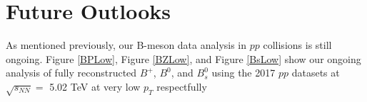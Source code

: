 









\section{Future Outlooks}

As mentioned previously, our B-meson data analysis in $pp$ collisions is still ongoing. Figure \ref{BPLow}, Figure \ref{BZLow}, and Figure \ref{BsLow} show our ongoing analysis of fully reconstructed $B^+$, $B^0$, and $B^0_s$ using the 2017 $pp$ datasets at $\sqrt {s_{NN}} = $ 5.02 TeV at very low $p_T$ respectfully


